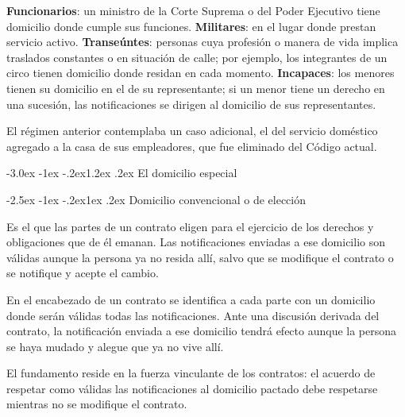 \documentclass[12pt,oneside]{book}
\makeatletter
\renewcommand\section{\@startsection{section}{1}{\z@}%
  {-3.0ex \@plus -1ex \@minus -.2ex}{1.2ex \@plus .2ex}%
  {\normalfont\large\bfseries\color{acento}}}
\renewcommand\subsection{\@startsection{subsection}{2}{\z@}%
  {-2.5ex \@plus -1ex \@minus -.2ex}{1ex \@plus .2ex}%
  {\normalfont\normalsize\bfseries}}
\makeatother
\begin{document}
\begin{ejemplo}
\textbf{Funcionarios}: un ministro de la Corte Suprema o del Poder Ejecutivo tiene domicilio donde cumple sus funciones. \textbf{Militares}: en el lugar donde prestan servicio activo. \textbf{Transeúntes}: personas cuya profesión o manera de vida implica traslados constantes o en situación de calle; por ejemplo, los integrantes de un circo tienen domicilio donde residan en cada momento. \textbf{Incapaces}: los menores tienen su domicilio en el de su representante; si un menor tiene un derecho en una sucesión, las notificaciones se dirigen al domicilio de sus representantes.
\end{ejemplo}

El régimen anterior contemplaba un caso adicional, el del servicio doméstico agregado a la casa de sus empleadores, que fue eliminado del Código actual.

\section{El domicilio especial}

\subsection{Domicilio convencional o de elección}

\begin{definicion}
Es el que las partes de un contrato eligen para el ejercicio de los derechos y obligaciones que de él emanan. Las notificaciones enviadas a ese domicilio son válidas aunque la persona ya no resida allí, salvo que se modifique el contrato o se notifique y acepte el cambio.
\end{definicion}

\begin{ejemplo}
En el encabezado de un contrato se identifica a cada parte con un domicilio donde serán válidas todas las notificaciones. Ante una discusión derivada del contrato, la notificación enviada a ese domicilio tendrá efecto aunque la persona se haya mudado y alegue que ya no vive allí.
\end{ejemplo}

El fundamento reside en la fuerza vinculante de los contratos: el acuerdo de respetar como válidas las notificaciones al domicilio pactado debe respetarse mientras no se modifique el contrato.
\end{document}
